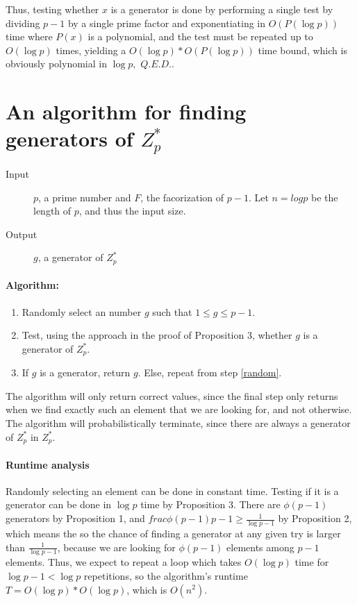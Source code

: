 \documentclass{article}
\newcommand{\z}[1]{Z^*_{#1}}
\begin{document}
Thus, testing whether $x$ is a generator is done by performing a single test by
dividing $p-1$ by a single prime factor and exponentiating in $O(P(\log p))$
time where $P(x)$ is a polynomial, and the test must be repeated up to $O(\log
p)$ times, yielding a $O(\log p) * O(P(\log p))$ time bound, which is obviously
polynomial in $\log p,$ $Q.E.D.$.

\section{An algorithm for finding generators of $\z p$}

\begin{description}
\item[Input] $p$, a prime number and $F$, the facorization of $p-1$. Let $n =
  log p$ be the length of $p$, and thus the input size.
  \item[Output] $g$, a generator of $\z p$
\end{description}

\paragraph{Algorithm:}
\begin{enumerate}
  \item\label{random} Randomly select an number $g$ such that $1 \leq g \leq p - 1$.
   \item Test, using the approach in the proof of Proposition 3, whether $g$ is
     a generator of $\z p$.
   \item If $g$ is a generator, return $g$. Else, repeat from step \ref{random}.
\end{enumerate}

The algorithm will only return correct values, since the final step only returns
when we find exactly such an element that we are looking for, and not otherwise.
The algorithm will probabilistically terminate, since there are always a
generator of $\z p$ in $\z p$.

\paragraph{Runtime analysis}

Randomly selecting an element can be done in constant time. Testing if it is a
generator can be done in $\log p$ time by Proposition 3. There are $\phi(p-1)$
generators by Proposition 1, and $frac{\phi(p-1)}{p-1} \geq \frac{1}{\log p-1}$
by Proposition 2, which means the so the chance of finding a generator at any given
try is larger than $\frac{1}{\log p-1}$, because we are looking for $\phi(p-1)$
elements among $p-1$ elements. Thus, we expect to repeat a loop which takes
$O(\log p)$ time for $\log p - 1 < \log p$ repetitions, so the algorithm's
runtime $T = O(\log p) * O(\log p)$, which is $O(n^2)$.

  
\end{document}
